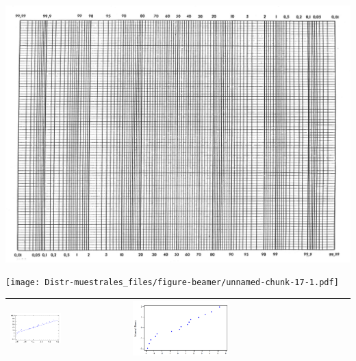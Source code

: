 \documentclass[
  10pt,
  ignorenonframetext,
]{beamer}
\begin{document}
\begin{frame}{}
\begin{minipage}{\textwidth}
\begin{multicols}{2}
\end{multicols}

\end{minipage}
\end{frame}

\begin{frame}{}
\protect\hypertarget{section-39}{}
\includegraphics{figuras/probpaperLandscape.png}
\end{frame}

\begin{frame}{}
\protect\hypertarget{section-40}{}
\texttt{[image: Distr-muestrales\_files/figure-beamer/unnamed-chunk-17-1.pdf]}
\end{frame}

\begin{frame}{}
\protect\hypertarget{section-41}{}
\begin{longtable}[]{@{}
  >{\raggedright\arraybackslash}p{}
  >{\raggedleft\arraybackslash}p{}@{}}
\toprule()
\endhead
\includegraphics[width=0.45\textwidth,height=\textheight]{figuras/Papel1.png}
&
\includegraphics[width=0.45\textwidth,height=\textheight]{figuras/Papel2.png} \\
\bottomrule()
\end{longtable}
\end{frame}
\end{document}
